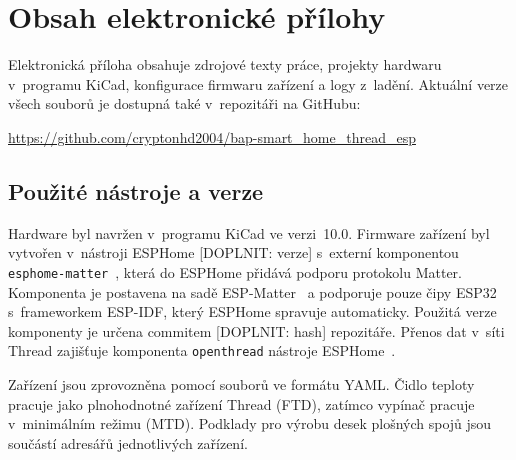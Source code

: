 \chapter{Obsah elektronické přílohy}

Elektronická příloha obsahuje zdrojové texty práce, projekty hardwaru
v~programu KiCad, konfigurace firmwaru zařízení a logy z~ladění. Aktuální
verze všech souborů je dostupná také v~repozitáři na GitHubu:

\makeatletter
\g@addto@macro\UrlBreaks{\do\_}
\makeatother
\begin{center}
  \small\url{https://github.com/cryptonhd2004/bap-smart_home_thread_esp}
\end{center}

\section*{Použité nástroje a verze}

Hardware byl navržen v~programu KiCad ve verzi~10.0. Firmware zařízení byl
vytvořen v~nástroji ESPHome [DOPLNIT: verze] s~externí komponentou
\texttt{esphome-matter}~\cite{esphome-matter}, která do ESPHome přidává
podporu protokolu Matter. Komponenta je postavena na sadě
ESP-Matter~\cite{espressif-esp-matter} a podporuje pouze čipy ESP32
s~frameworkem ESP-IDF, který ESPHome spravuje automaticky. Použitá verze
komponenty je určena commitem [DOPLNIT: hash] repozitáře. Přenos dat
v~síti Thread zajišťuje komponenta \texttt{openthread}
nástroje ESPHome~\cite{esphome-openthread}.

Zařízení jsou zprovozněna pomocí souborů ve formátu YAML. Čidlo teploty
pracuje jako plnohodnotné zařízení Thread (FTD), zatímco vypínač pracuje
v~minimálním režimu (MTD). Podklady pro výrobu desek plošných spojů jsou
součástí adresářů jednotlivých zařízení.

\bigskip

{\small
{}
}
